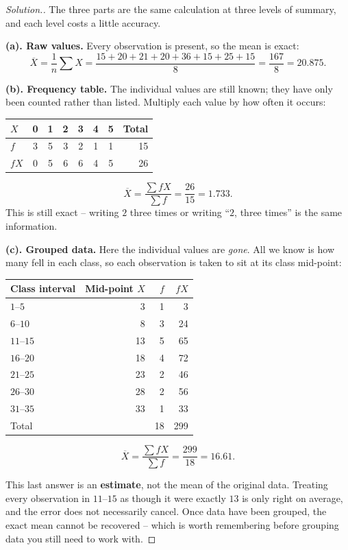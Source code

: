\documentclass[11pt,a4paper]{article}
\theoremstyle{definition}
\newenvironment{solution}
  {\renewcommand{\qedsymbol}{}\begin{proof}[\textit{Solution}.]}
  {\end{proof}}
\begin{document}
\begin{solution}
The three parts are the same calculation at three levels of summary, and each level costs
a little accuracy.

\textbf{(a). Raw values.} Every observation is present, so the mean is exact:
\[\overline{X}=\frac{1}{n}\sum X=\frac{15+20+21+20+36+15+25+15}{8}=\frac{167}{8}=20.875.\]

\textbf{(b). Frequency table.} The individual values are still known; they have only been
counted rather than listed. Multiply each value by how often it occurs:
\begin{table}[H]
\centering
\begin{tabular}{lccccccr}
$X$    & 0 & 1 & 2 & 3 & 4 & 5 & Total\\
\hline
$f$    & 3 & 5 & 3 & 2 & 1 & 1 & 15\\
$fX$   & 0 & 5 & 6 & 6 & 4 & 5 & 26\\
\end{tabular}
\end{table}
\[\overline{X}=\frac{\sum fX}{\sum f}=\frac{26}{15}=1.733.\]
This is still exact -- writing $2$ three times or writing ``$2$, three times'' is the same
information.

\textbf{(c). Grouped data.} Here the individual values are \emph{gone}. All we know is how
many fell in each class, so each observation is taken to sit at its class mid-point:
\begin{table}[H]
\centering
\begin{tabular}{lrrr}
Class interval & Mid-point $X$ & $f$ & $fX$\\
\hline
$1$--$5$   & 3  & 1  & 3\\
$6$--$10$  & 8  & 3  & 24\\
$11$--$15$ & 13 & 5  & 65\\
$16$--$20$ & 18 & 4  & 72\\
$21$--$25$ & 23 & 2  & 46\\
$26$--$30$ & 28 & 2  & 56\\
$31$--$35$ & 33 & 1  & 33\\
\hline
Total      &    & 18 & 299\\
\end{tabular}
\end{table}
\[\overline{X}=\frac{\sum fX}{\sum f}=\frac{299}{18}=16.61.\]

This last answer is an \textbf{estimate}, not the mean of the original data. Treating every
observation in $11$--$15$ as though it were exactly $13$ is only right on average, and the
error does not necessarily cancel. Once data have been grouped, the exact mean cannot be
recovered -- which is worth remembering before grouping data you still need to work with.
\end{solution}
\end{document}
